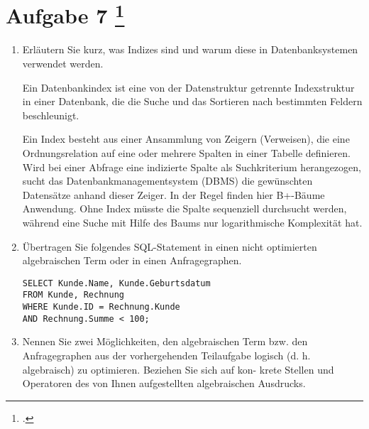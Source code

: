 \documentclass{lehramt-informatik-aufgabe}
\begin{document}
\section{Aufgabe 7
\footcite{66116:2021:03}}
\begin{enumerate}


\item Erläutern Sie kurz, was Indizes sind und warum diese in
Datenbanksystemen verwendet werden.

\begin{liAntwort}
Ein Datenbankindex ist eine von der Datenstruktur getrennte
Indexstruktur in einer Datenbank, die die Suche und das Sortieren nach
bestimmten Feldern beschleunigt.

Ein Index besteht aus einer Ansammlung von Zeigern (Verweisen), die eine
Ordnungsrelation auf eine oder mehrere Spalten in einer Tabelle
definieren. Wird bei einer Abfrage eine indizierte Spalte als
Suchkriterium herangezogen, sucht das Datenbankmanagementsystem (DBMS)
die gewünschten Datensätze anhand dieser Zeiger. In der Regel finden
hier B+-Bäume Anwendung. Ohne Index müsste die Spalte sequenziell
durchsucht werden, während eine Suche mit Hilfe des Baums nur
logarithmische Komplexität hat.
\end{liAntwort}


\item Übertragen Sie folgendes SQL-Statement in einen nicht optimierten
algebraischen Term oder in einen Anfragegraphen.

\begin{verbatim}
SELECT Kunde.Name, Kunde.Geburtsdatum
FROM Kunde, Rechnung
WHERE Kunde.ID = Rechnung.Kunde
AND Rechnung.Summe < 100;
\end{verbatim}

\begin{liAntwort}

\end{liAntwort}


\item Nennen Sie zwei Möglichkeiten, den algebraischen Term bzw. den
Anfragegraphen aus der vorhergehenden Teilaufgabe logisch (d. h.
algebraisch) zu optimieren. Beziehen Sie sich auf kon- krete Stellen und
Operatoren des von Ihnen aufgestellten algebraischen Ausdrucks.

\begin{liAntwort}

\end{liAntwort}

\end{enumerate}
\end{document}

